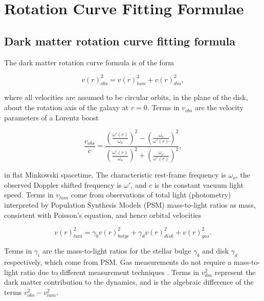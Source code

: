 \documentclass[reprint,%
 amsmath,amssymb,
 aps,
]{revtex4-1}
\begin{document}
\section{Rotation Curve Fitting Formulae  \label{sec:dos}}
 
 
 \subsection{Dark matter rotation curve fitting formula}
 
  

 The   dark matter rotation curve formula   is of the form

 \begin{equation}
v(r)^2_{obs}  =  v(r)^2_{lum}  +  v(r)^2_{dm},   
\label{eq:zonte1}
\end{equation} 

  where all velocities are assumed to be circular orbits, in the plane of the disk,  about the rotation axis of the galaxy at  $r=0$. 
Terms in  $v_{obs}$ are the velocity parameters   of a  Lorentz boost
   

 \begin{equation}
 \frac{v_{obs} }{c}=
\frac{  \left( \frac{\omega'(r)}{\omega_o}\right)^2 -  \left( \frac{\omega_o}{\omega'(r)} \right)^2 }{  \left( \frac{\omega'(r)}{\omega_o}\right)^2  +  \left( \frac{\omega_o}{\omega'(r)}\right)^2 },
\label{eq:modelLumA}
\end{equation} 

 in flat Minkowski spacetime. 
 The    
  characteristic rest-frame frequency is $\omega_o$, the  observed  Doppler shifted frequency is $\omega'$, and $c$ is the constant vacuum light speed.  
 Terms in  $v_{lum}$ come from observations of total light  (photometry) interpreted by Population Synthesis Models (PSM) mass-to-light ratios as mass, consistent with Poisson's equation, and  hence orbital velocities  
  
   \begin{equation}
v(r)_{lum}^2 = \gamma_b v(r)_{bulge}^2 +  \gamma_d v(r)_{disk}^2 + v(r)_{gas}^2.    
\label{eq:zonte3}
\end{equation} 
  
 Terms in    $\gamma_i$  are the mass-to-light ratios for the stellar bulge $\gamma_b$ and disk $\gamma_d$ respectively, which come from PSM. Gas measurements do not require  a mass-to-light ratio due to different measurement techniques \citep{2016Lelli}.  
 Terms in $v^2_{dm}$ represent
the dark matter contribution to the dynamics, and is  the algebraic difference of the   terms  $v^2_{obs}-v^2_{lum}$. 
\end{document}
